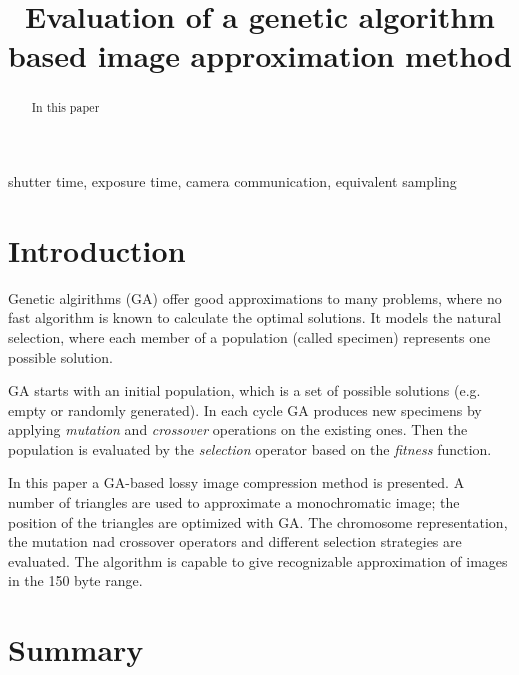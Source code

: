 \documentclass[conference]{IEEEtran}
\begin{document}
\title{Evaluation of a genetic algorithm based image approximation method}

\author{
}

\maketitle

\begin{abstract}
In this paper
\end{abstract}

\begin{IEEEkeywords}
shutter time, exposure time, camera communication, equivalent sampling
\end{IEEEkeywords}

\section{Introduction}

Genetic algirithms (GA) \cite{b1} offer good approximations to many
problems, where no fast algorithm is known to calculate
the optimal solutions. It models the natural selection,
where each member of a population (called specimen)
represents one possible solution.

GA starts with an initial population, which is a set of
possible solutions (e.g. empty or randomly generated).
In each cycle GA produces new specimens by applying
\emph{mutation} and \emph{crossover} operations on the
existing ones. Then the population is evaluated by
the \emph{selection} operator based on the \emph{fitness}
function.

In this paper a GA-based lossy image compression method is
presented. A number of triangles are used to approximate
a monochromatic image; the position of the triangles are
optimized with GA. The chromosome representation, the
mutation nad crossover operators and different selection
strategies are evaluated. The algorithm is capable to give
recognizable approximation of images in the 150 byte range.
\section{Summary}
\end{document}
